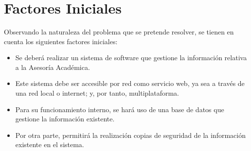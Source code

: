 \section{Factores Iniciales}

\paragraph{}Observando la naturaleza del problema que se pretende resolver, se
tienen en cuenta los siguientes factores iniciales:

\begin{itemize}
   \item Se deberá realizar un sistema de software que gestione la información
   relativa a la Asesoría Académica.
   \item Este sistema debe ser accesible por red como servicio web, ya sea a
   través de una red local o internet; y, por tanto, multiplataforma.
   \item Para su funcionamiento interno, se hará uso de una base de datos que
   gestione la información existente.
   \item Por otra parte, permitirá la realización copias de seguridad de la
   información existente en el sistema.
\end{itemize}
